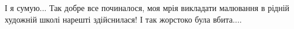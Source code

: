  
 
 
 
 

\qqSecCmt


І я сумую... Так добре все починалося, моя мрія викладати малювання в рідній
художній школі нарешті здійснилася! І так жорстоко була вбита....
